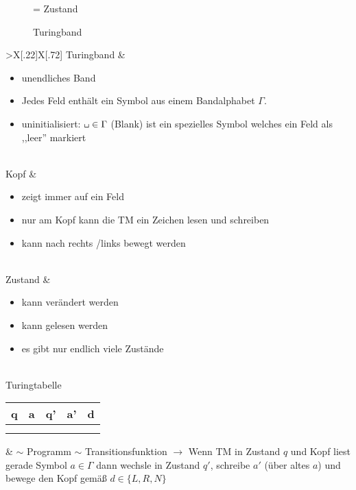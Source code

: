 {\begin{figure}[H]
	\vspace{-1em}
	\caption{Turingband}
	 = Zustand
\end{figure}
\vspace{-.5em}
\begin{tabu}{>{\bfseries}X[.22]X[.72]}
	Turingband & \vspace{-1em}\begin{itemize}[leftmargin=1em,parsep=0pt,topsep=0pt]
	\item unendliches Band
	\item Jedes Feld enthält ein Symbol aus einem Bandalphabet $\Gamma$.
	\item uninitialisiert: $\blank\in\Gamma$ (Blank) ist ein spezielles Symbol welches ein Feld als ,,leer'' markiert
	\end{itemize}
	\\
	Kopf & \vspace{-1em}\begin{itemize}[leftmargin=1em,parsep=0pt,topsep=0pt]
	\item zeigt immer auf ein Feld
	\item nur am Kopf kann die \ac{TM} ein Zeichen lesen und schreiben
	\item kann nach rechts /links bewegt werden
	\end{itemize}\\
	Zustand & \vspace{-1em}\begin{itemize}[leftmargin=1em,parsep=0pt,topsep=0pt]
	\item kann verändert werden
	\item kann gelesen werden
	\item es gibt nur endlich viele Zustände
	\end{itemize}\\
	Turingtabelle\newline\normalfont
	\begin{tabular}{|*5{c|}}
		q & a & q' & a' & d \\\hline
		&&&&\\
		&&&&
	\end{tabular}
	& $\sim$ Programm $\sim$ Transitionsfunktion \newline
	$\rightarrow$ Wenn \ac{TM} in Zustand $q$ und Kopf liest
        gerade Symbol $a\in\Gamma$ dann wechsle in Zustand $q'$,
        schreibe $a'$ (über altes $a$) und bewege den Kopf gemäß
        $d\in\{L,R,N\}$ 
\end{tabu}\

}
